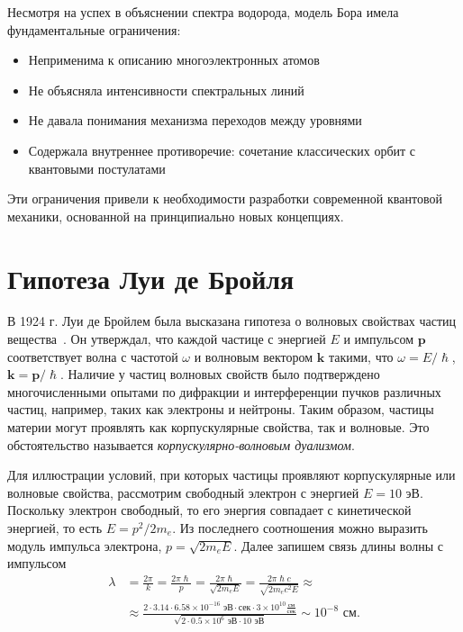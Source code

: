 \documentclass[a4paper, 12pt]{article}
\begin{document}
Несмотря на успех в объяснении спектра водорода, модель Бора имела фундаментальные ограничения:
\begin{itemize}
\item Неприменима к описанию многоэлектронных атомов
\item Не объясняла интенсивности спектральных линий
\item Не давала понимания механизма переходов между уровнями
\item Содержала внутреннее противоречие: сочетание классических орбит с квантовыми постулатами
\end{itemize}

Эти ограничения привели к необходимости разработки современной квантовой
механики, основанной на принципиально новых концепциях.

\section{Гипотеза Луи де Бройля}

В 1924 г. Луи де Бройлем была высказана гипотеза о волновых свойствах частиц
вещества~\cite{deBroglie1924, deBroglie1925}. Он утверждал, что каждой частице с энергией $E$ и импульсом $\bm{p}$
соответствует волна с частотой $\omega$ и волновым вектором $\bm{k}$ такими, что
$\omega=E/\hslash$, $\bm{k} = \bm{p}/\hslash$. Наличие у частиц волновых свойств было
подтверждено многочисленными опытами по дифракции и интерференции пучков
различных частиц, например, таких как электроны и нейтроны. Таким образом,
частицы материи могут проявлять как корпускулярные свойства, так и волновые. Это
обстоятельство называется \textit{корпускулярно-волновым дуализмом}.

Для иллюстрации условий, при которых частицы проявляют корпускулярные или
волновые свойства, рассмотрим свободный электрон с энергией $E=10\text{ эВ}$.
Поскольку электрон свободный, то его энергия совпадает с кинетической энергией,
то есть $E=p^2/2m_e$. Из последнего соотношения можно выразить модуль импульса
электрона, $p = \sqrt{2m_eE}$. Далее запишем связь длины волны с импульсом
\begin{equation}
  \label{eq:wave-length}
  \begin{split}
    \lambda &= \frac{2\pi}{k} = \frac{2\pi\hslash}{p} = \frac{2\pi\hslash}{\sqrt{2m_eE}} = \frac{2\pi\hslash c}{\sqrt{2m_ec^2E}}  \approx \\
      &\approx\frac{2\cdot{3.14}\cdot{6.58}\times{10^{-16}}\text{ эВ}\cdot\text{сек}\cdot{3}\times{10^{10}}\frac{\text{см}}{\text{сек}}}{\sqrt{2 \cdot 0.5\times{10^6}\text{ эВ}\cdot{10}\text{ эВ}}}\sim 10^{-8}\text{ см}.
  \end{split}
\end{equation}
\end{document}
